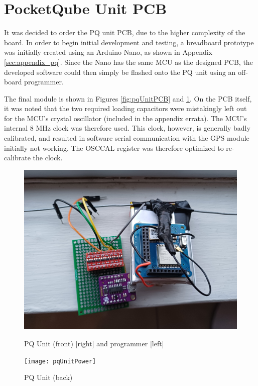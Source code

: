 \graphicspath{{./figures}}

\section{PocketQube Unit PCB}

It was decided to order the PQ unit PCB, due to the higher complexity of the board. In order to begin initial development and testing, a breadboard prototype was initially created using an Arduino Nano, as shown in Appendix \ref{sec:appendix_pq}. Since the Nano has the same MCU as the designed PCB, the developed software could then simply be flashed onto the PQ unit using an off-board programmer.

The final module is shown in Figures \ref{fig:pqUnitPCB} and \ref{fig:pqUnitPower}. On the PCB itself, it was noted that the two required loading capacitors were mistakingly left out for the MCU's crystal oscillator (included in the appendix errata). The MCU's internal 8 MHz clock was therefore used. This clock, however, is generally badly calibrated, and resulted in software serial communication with the GPS module initially not working. The OSCCAL register was therefore optimized to re-calibrate the clock.

\begin{figure}[!htb]
  \begin{minipage}{.49\textwidth}
    \centering
    \includegraphics[width=0.85\linewidth]{pqUnitPCB}
    \caption{PQ Unit (front) [right] and programmer [left]}
    \label{fig:pqUnitPCB}
  \end{minipage}
  \begin{minipage}{.49\textwidth}
    \centering
    \texttt{[image: pqUnitPower]}
    \caption{PQ Unit (back)}
    \label{fig:pqUnitPower}
  \end{minipage}
\end{figure}

